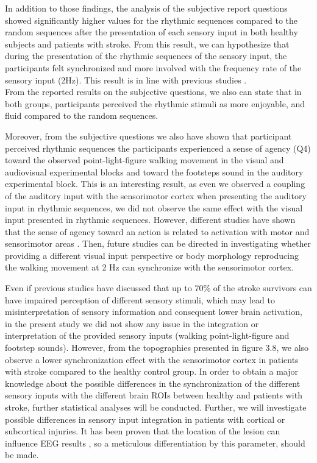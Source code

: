 In addition to those findings, the analysis of the subjective report questions showed significantly higher values for the rhythmic sequences compared to the random sequences after the presentation of each sensory input in both healthy subjects and patients with stroke. From this result, we can hypothesize that during the presentation of the rhythmic sequences of the sensory input, the participants felt synchronized and more involved with the frequency rate of the sensory input (2Hz). This result is in line with previous studies \parencite{Nozaradan_2016}. \\
From the reported results on the subjective questions, we also can state that in both groups, participants perceived the rhythmic stimuli as more enjoyable, and fluid compared to the random sequences. 

Moreover, from the subjective questions we also have shown that participant perceived rhythmic sequences the participants experienced a sense of agency (Q4) toward the observed point-light-figure walking movement in the visual and audiovisual experimental blocks and toward the footsteps sound in the auditory experimental block. This is an interesting result, as even we observed a coupling of the auditory input with the sensorimotor cortex when presenting the auditory input in rhythmic sequences, we did not observe the same effect with the visual input presented in rhythmic sequences. However, different studies have shown that the sense of agency toward an action is related to activation with motor and sensorimotor areas \parencite{Buhrmann_2017,Longo_2009}. Then, future studies can be directed in investigating whether providing a different visual input perspective or body morphology reproducing the walking movement at 2 Hz can synchronize with the sensorimotor cortex. 

Even if previous studies have discussed that up to 70\% of the stroke survivors can have impaired perception of different sensory stimuli, which may lead to misinterpretation of sensory information \parencite{Hazelton_2022} and consequent lower brain activation, in the present study we did not show any issue in the integration or interpretation of the provided sensory inputs (walking point-light-figure and footstep sounds). However, from the topographies presented in figure 3.8, we also observe a lower synchronization effect with the sensorimotor cortex in patients with stroke compared to the healthy control group.
In order to obtain a major knowledge about the possible differences in the synchronization of the different sensory inputs with the different brain ROIs between healthy and patients with stroke, further statistical analyses will be conducted. Further, we will investigate possible differences in sensory input integration in patients with cortical or subcortical injuries. It has been proven that the location of the lesion can influence EEG results \parencite{Clark_2015}, so a meticulous differentiation by this parameter, should be made. 

